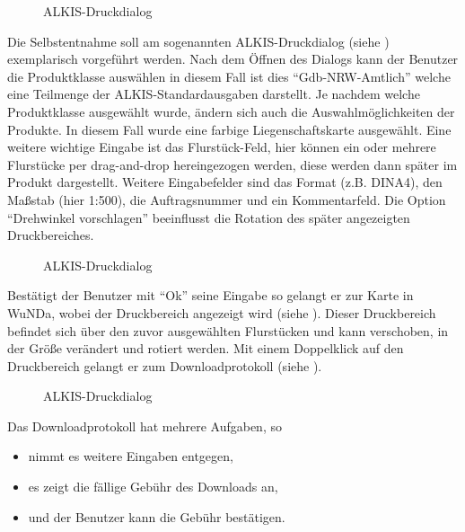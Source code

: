 \begin{figure}[htbp]
	\centering
	\caption{ALKIS-Druckdialog}
	\label{fig:alkis-druck}
\end{figure}

Die Selbstentnahme soll am sogenannten ALKIS-Druckdialog (siehe ) exemplarisch vorgeführt werden.
Nach dem Öffnen des Dialogs kann der Benutzer die Produktklasse auswählen in diesem Fall ist dies "`Gdb-NRW-Amtlich"' welche eine Teilmenge der ALKIS-Standardausgaben darstellt. 
Je nachdem welche Produktklasse ausgewählt wurde, ändern sich auch die Auswahlmöglichkeiten der Produkte. In diesem Fall wurde eine farbige Liegenschaftskarte ausgewählt.
Eine weitere wichtige Eingabe ist das Flurstück-Feld, hier können ein oder mehrere Flurstücke per drag-and-drop hereingezogen werden, diese werden dann später im Produkt dargestellt.
Weitere Eingabefelder sind das Format (z.B. DINA4), den  Maßstab (hier 1:500), die Auftragsnummer und ein Kommentarfeld. Die Option "`Drehwinkel vorschlagen"' beeinflusst die Rotation des später angezeigten Druckbereiches.

\begin{figure}[htbp]
	\centering
	\caption{ALKIS-Druckdialog}
	\label{fig:alkis-auswahl}
\end{figure}

Bestätigt der Benutzer mit "`Ok"' seine Eingabe so gelangt er zur Karte in \ac{WuNDa}, wobei der Druckbereich angezeigt wird (siehe ).
Dieser Druckbereich befindet sich über den zuvor ausgewählten Flurstücken und kann verschoben, in der Größe verändert und rotiert werden.
Mit einem Doppelklick auf den Druckbereich gelangt er zum Downloadprotokoll (siehe ).  

\begin{figure}[htbp]
	\centering
	\caption{ALKIS-Druckdialog}
	\label{fig:alkis-protocol}
\end{figure}

Das Downloadprotokoll hat mehrere Aufgaben, so 
\begin{itemize}
\item nimmt es weitere Eingaben entgegen,
\item es zeigt die fällige Gebühr des Downloads an,
\item und der Benutzer kann die Gebühr bestätigen.
\end{itemize}

